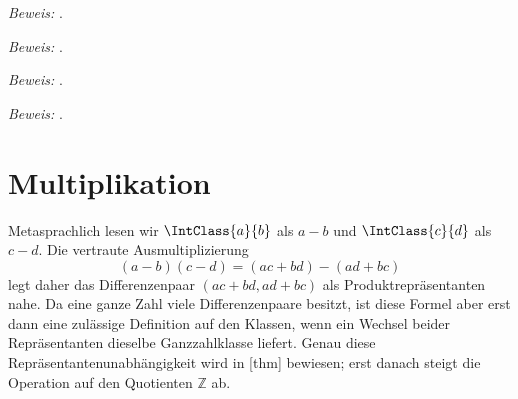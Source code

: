 \documentclass[main.tex]{subfiles}
\begin{document}




\par\noindent\emph{Beweis:} .\par


\par\noindent\emph{Beweis:} .\par


\par\noindent\emph{Beweis:} .\par


\par\noindent\emph{Beweis:} .\par


\section{Multiplikation}

Metasprachlich lesen wir \(\IntClass{a}{b}\) als \(a-b\) und
\(\IntClass{c}{d}\) als \(c-d\). Die vertraute Ausmultiplizierung
\[
  (a-b)(c-d)=(ac+bd)-(ad+bc)
\]
legt daher das Differenzenpaar \((ac+bd,ad+bc)\) als Produktrepräsentanten
nahe. Da eine ganze Zahl viele Differenzenpaare besitzt, ist diese Formel
aber erst dann eine zulässige Definition auf den Klassen, wenn ein Wechsel
beider Repräsentanten dieselbe Ganzzahlklasse liefert. Genau diese
Repräsentantenunabhängigkeit wird in
[thm] bewiesen; erst danach
steigt die Operation auf den Quotienten \(\mathbb Z\) ab.
\end{document}
